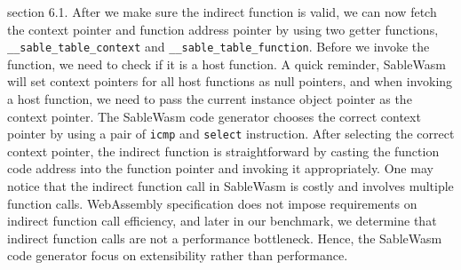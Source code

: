 section 6.1. After we make sure the indirect function is valid, we can now
fetch the context pointer and function address pointer by using two getter
functions, \texttt{\_\_sable\_table\_context} and
\texttt{\_\_sable\_table\_function}. Before we invoke the function, we need to
check if it is a host function. A quick reminder, SableWasm will set context
pointers for all host functions as null pointers, and when invoking a host
function, we need to pass the current instance object pointer as the context
pointer. The SableWasm code generator chooses the correct context pointer by
using a pair of \texttt{icmp} and \texttt{select} instruction. After selecting
the correct context pointer, the indirect function is straightforward by
casting the function code address into the function pointer and invoking it
appropriately. One may notice that the indirect function call in SableWasm is
costly and involves multiple function calls. WebAssembly specification does not
impose requirements on indirect function call efficiency, and later in our
benchmark, we determine that indirect function calls are not a performance
bottleneck. Hence, the SableWasm code generator focus on extensibility rather
than performance.

